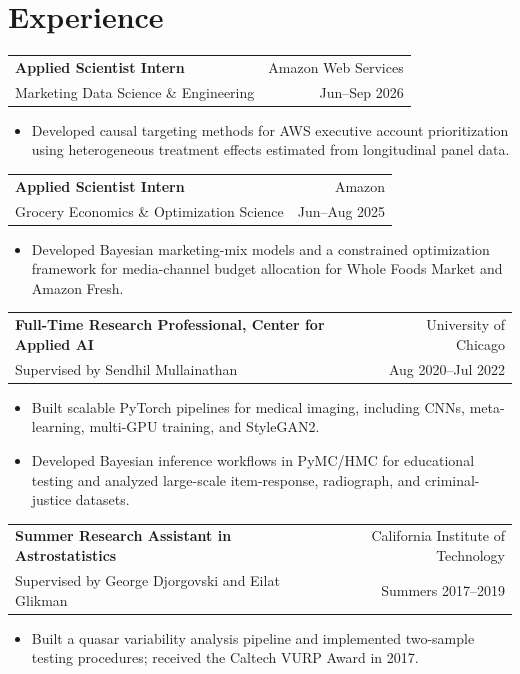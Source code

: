 \documentclass[11pt,letterpaper]{article}
\makeatletter
\newcommand{\entry}[4]{%
  \begin{tabularx}{\textwidth}{@{}Xr@{}}
    \textbf{#1} & #2 \\
    #3 & #4
  \end{tabularx}%
}
\makeatother
\begin{document}
\section*{Experience}

\entry
  {Applied Scientist Intern}
  {Amazon Web Services}
  {Marketing Data Science \& Engineering}
  {Jun--Sep 2026}

\begin{itemize}
  \item Developed causal targeting methods for AWS executive account
  prioritization using heterogeneous treatment effects estimated from
  longitudinal panel data.
\end{itemize}

\vspace{0.28em}

\entry
  {Applied Scientist Intern}
  {Amazon}
  {Grocery Economics \& Optimization Science}
  {Jun--Aug 2025}

\begin{itemize}
  \item Developed Bayesian marketing-mix models and a constrained optimization
  framework for media-channel budget allocation for Whole Foods Market and
  Amazon Fresh.
\end{itemize}

\vspace{0.28em}

\entry
  {Full-Time Research Professional, Center for Applied AI}
  {University of Chicago}
  {Supervised by Sendhil Mullainathan}
  {Aug 2020--Jul 2022}

\begin{itemize}
  \item Built scalable PyTorch pipelines for medical imaging, including CNNs,
  meta-learning, multi-GPU training, and StyleGAN2.
  \item Developed Bayesian inference workflows in PyMC/HMC for educational
  testing and analyzed large-scale item-response, radiograph, and
  criminal-justice datasets.
\end{itemize}

\vspace{0.28em}

\entry
  {Summer Research Assistant in Astrostatistics}
  {California Institute of Technology}
  {Supervised by George Djorgovski and Eilat Glikman}
  {Summers 2017--2019}

\begin{itemize}
  \item Built a quasar variability analysis pipeline and implemented
  two-sample testing procedures; received the Caltech VURP Award in 2017.
\end{itemize}
\end{document}
